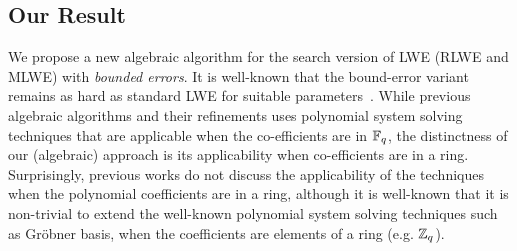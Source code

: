 \subsection{Our Result}

We propose a new algebraic algorithm for the search version of LWE (RLWE and MLWE) with \emph{bounded errors}. %
It is well-known that the bound-error variant remains as hard as standard LWE for suitable parameters~\cite{MicPei13}. While previous algebraic
algorithms and their refinements uses polynomial system solving techniques that are applicable when the co-efficients are in $\mathbb{F}_q$, the distinctness of
our (algebraic) approach is its applicability when co-efficients are in a ring. Surprisingly, previous works do not discuss the applicability of the techniques when the polynomial coefficients are in a ring, although it is well-known that it is non-trivial to extend the well-known polynomial system solving techniques such as Gr\"obner basis, when the coefficients are elements of a ring (e.g. $\mathbb{Z}_q$). 

